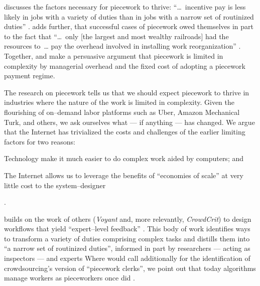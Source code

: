 \documentclass[trackingWork]{subfiles}
\begin{document}
\citeauthor{Brown01041990} discusses the factors necessary for piecework to thrive:
    ``\dots~incentive pay is less likely in jobs with
    a variety of duties than in jobs with a narrow set of routinized duties''
\cite{Brown01041990}.
\citeauthor{10.2307/23702539} adds further, that
successful cases of piecework owed themselves in part to the fact that
    ``\dots~only [the largest and most wealthy railroads] had the resources to~\dots
    pay the overhead involved in installing work reorganization''
\cite{10.2307/23702539}.
Together, \citeauthor{10.2307/23702539} and \citeauthor{Brown01041990}
make a persuasive argument that piecework is limited in complexity by
managerial overhead and the fixed cost of adopting a piecework payment regime.


\subsubsubsection{\whatchanged}
The research on piecework tells us that
we should expect piecework to thrive in industries where
the nature of the work is limited in complexity.
Given the flourishing of on--demand labor platforms such as
Uber, Amazon Mechanical Turk, and others, we ask ourselves
what --- if anything --- has changed.
We argue that
the Internet has trivialized
the costs and challenges of the earlier limiting factors for two reasons:
\begin{inlinelist}
  \item Technology make it much easier to do complex work aided by computers; and %
  \item The Internet allows us to leverage the benefits of
        ``economies of scale'' at very little cost
        to the system--designer \cite{lessig2006code}
\end{inlinelist}.

\citeauthor{yuanAlmost} builds on the work of others
(\textit{Voyant} and, more relevantly, \textit{CrowdCrit})
to design workflows that yield ``expert--level feedback''
\cite{yuanAlmost,Xu:2014:VGS:2531602.2531604,Luther:2014:CCA:2556420.2556788}.
This body of work identifies ways to transform a variety of duties comprising complex tasks
and distills them into ``a narrow set of routinized duties'',
informed in part by researchers --- acting as inspectors --- and experts
\cite[quotations from][]{10.2307/23702539}
Where \citeauthor{10.2307/23702539} would call additionally for the identification of
crowdsourcing's version of ``piecework clerks'', we point out that
today algorithms manage workers as pieceworkers once did
\cite{uberAlgorithm,10.2307/23702539}.
\end{document}
